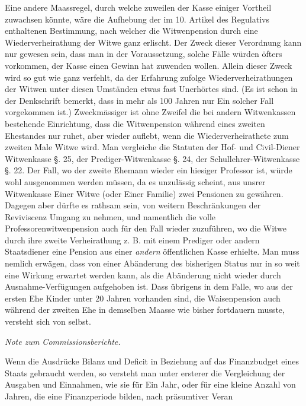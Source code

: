 Eine andere Maassregel, durch welche zuweilen der Kasse einiger Vortheil zuwachsen könnte, wäre die Aufhebung der im 10. Artikel des Regulativs enthaltenen Bestimmung, nach welcher die Witwenpension durch eine Wiederverheirathung der Witwe ganz erlischt. Der Zweck dieser Verordnung kann nur gewesen sein, dass man in der Voraussetzung, solche Fälle würden öfters vorkommen, der Kasse einen Gewinn hat zuwenden wollen. Allein dieser Zweck wird so gut wie ganz verfehlt, da der Erfahrung zufolge Wiederverheirathungen der Witwen unter diesen Umständen etwas fast Unerhörtes sind. (Es ist schon in der Denkschrift bemerkt, dass in mehr als 100 Jahren nur Ein solcher Fall vorgekommen ist.) Zweckmässiger ist ohne Zweifel die bei andern Witwenkassen bestehende Einrichtung, dass die Witwenpension während eines zweiten Ehestandes nur ruhet, aber wieder auflebt, wenn die Wiederverheirathete zum zweiten Male Witwe wird. Man vergleiche die Statuten der Hof- und Civil-Diener Witwenkasse §. 25, der Prediger-Witwenkasse §. 24, der Schullehrer-Witwenkasse §. 22. Der Fall, wo der zweite Ehemann wieder ein hiesiger Professor ist, würde wohl ausgenommen werden müssen, da es unzulässig scheint, aus unsrer Witwenkasse Einer Witwe (oder Einer Familie) zwei Pensionen zu gewähren. Dagegen aber dürfte es rathsam sein, von weitern Beschränkungen der Reviviscenz Umgang zu nehmen, und namentlich die volle Professorenwitwenpension auch für den Fall wieder zuzuführen, wo die Witwe durch ihre zweite Verheirathung z. B. mit einem Prediger oder andern Staatsdiener eine Pension aus einer \textit{andern} öffentlichen Kasse erhielte. Man muss nemlich erwägen, dass von einer Abänderung des bisherigen Status nur in so weit eine Wirkung erwartet werden kann, als die Abänderung nicht wieder durch Ausnahme-Verfügungen aufgehoben ist. Dass übrigens in dem Falle, wo aus der ersten Ehe Kinder unter 20 Jahren vorhanden sind, die Waisenpension auch während der zweiten Ehe in demselben Maasse wie bisher fortdauern musste, versteht sich von selbst.

\begin{center}\textit{Note zum Commissionsberichte.}\end{center}
\noindent\hspace*{\parindent}Wenn die Ausdrücke Bilanz und Deficit in Beziehung auf das Finanzbudget eines Staats gebraucht werden, so versteht man unter ersterer die Vergleichung der Ausgaben und Einnahmen, wie sie für Ein Jahr, oder für eine kleine Anzahl von Jahren, die eine Finanzperiode bilden, nach präsumtiver Veran%
